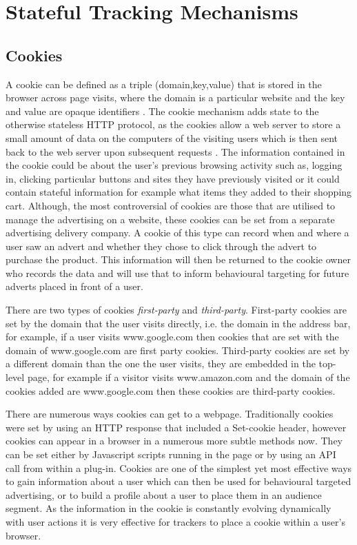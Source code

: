 \documentclass[12pt]{article}
\begin{document}
\section{Stateful Tracking Mechanisms}

\subsection {Cookies} \label{cookies}
A cookie can be defined as a triple (domain,key,value) that is stored in the browser across page visits, where the domain is a particular website and the key and value are opaque identifiers \parencite{roesner}. The cookie mechanism adds state to the otherwise stateless HTTP protocol, as the cookies allow a web server to store a small amount of data on the computers of the visiting users which is then sent back to the web server upon subsequent requests \parencite{cookielessMonster}. The information contained in the cookie could be about the user's previous browsing activity such as, logging in, clicking particular buttons and sites they have previously visited or it could contain stateful information for example what items they added to their shopping cart. Although, the most controversial of cookies are those that are utilised to manage the advertising on a website, these cookies can be set from a separate advertising delivery company. A cookie of this type can record when and where a user saw an advert and whether they chose to click through the advert to purchase the product. This information will then be returned to the cookie owner who records the data and will use that to inform behavioural targeting for future adverts placed in front of a user.  \newline 

There are two types of cookies \textit{first-party} and \textit{third-party}. First-party cookies are set by the domain that the user visits directly, i.e. the domain in the address bar, for example, if a user visits www.google.com then cookies that are set with the domain of www.google.com are first party cookies. Third-party cookies are set by a different domain than the one the user visits, they are embedded in the top-level page, for example if a visitor visits www.amazon.com and the domain of the cookies added are www.google.com then these cookies are third-party cookies. \newline

There are numerous ways cookies can get to a webpage. Traditionally cookies were set by using an HTTP response that included a Set-cookie header, however cookies can appear in a browser in a numerous more subtle methods now. They can be set either by Javascript scripts running in the page or by using an API call from within a plug-in. Cookies are one of the simplest yet most effective ways to gain information about a user which can then be used for behavioural targeted advertising, or to build a profile about a user to place them in an audience segment. As the information in the cookie is constantly evolving dynamically with user actions it is very effective for trackers to place a cookie within a user's browser. 
\end{document}
